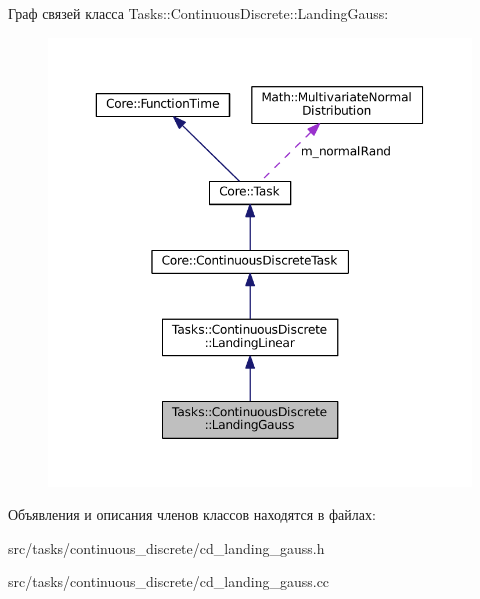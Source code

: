 Граф связей класса Tasks\+:\+:Continuous\+Discrete\+:\+:Landing\+Gauss\+:
\nopagebreak
\begin{figure}[H]
\begin{center}
\leavevmode
\includegraphics[width=350pt]{class_tasks_1_1_continuous_discrete_1_1_landing_gauss__coll__graph}
\end{center}
\end{figure}


Объявления и описания членов классов находятся в файлах\+:\begin{DoxyCompactItemize}
\item 
src/tasks/continuous\+\_\+discrete/cd\+\_\+landing\+\_\+gauss.\+h\item 
src/tasks/continuous\+\_\+discrete/cd\+\_\+landing\+\_\+gauss.\+cc\end{DoxyCompactItemize}
